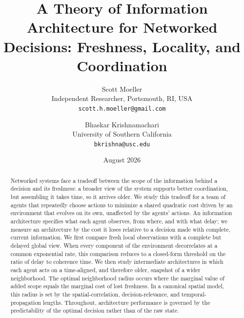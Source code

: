 \documentclass[11pt]{article}
\begin{document}
\title{A Theory of Information Architecture for Networked Decisions:
Freshness, Locality, and Coordination}
\author{
Scott Moeller\\
\small Independent Researcher, Portsmouth, RI, USA\\
\small \texttt{scott.h.moeller@gmail.com}
\and
Bhaskar Krishnamachari\\
\small University of Southern California\\
\small \texttt{bkrishna@usc.edu}
}

\date{August 2026}


\maketitle

\begin{abstract}
Networked systems face a tradeoff between the scope of the information behind a
decision and its freshness: a broader view of the system supports better
coordination, but assembling it takes time, so it arrives older. We study this
tradeoff for a team of agents that repeatedly choose actions to minimize a
shared quadratic cost driven by an environment that evolves on its own,
unaffected by the agents' actions. An information architecture specifies what
each agent observes, from where, and with what delay; we measure an architecture
by the cost it loses relative to a decision made with complete, current
information. We first compare fresh local observations with a complete but
delayed global view. When every component of the environment decorrelates at a
common exponential rate, this comparison reduces to a closed-form threshold on
the ratio of delay to coherence time. We then study intermediate architectures
in which each agent acts on a time-aligned, and therefore older, snapshot of a
wider neighborhood. The optimal neighborhood radius occurs where the marginal
value of added scope equals the marginal cost of lost freshness. In a canonical
spatial model, this radius is set by the spatial-correlation,
decision-relevance, and temporal-propagation lengths. Throughout, architecture
performance is governed by the predictability of the optimal decision rather
than of the raw state.
\end{abstract}
\end{document}
